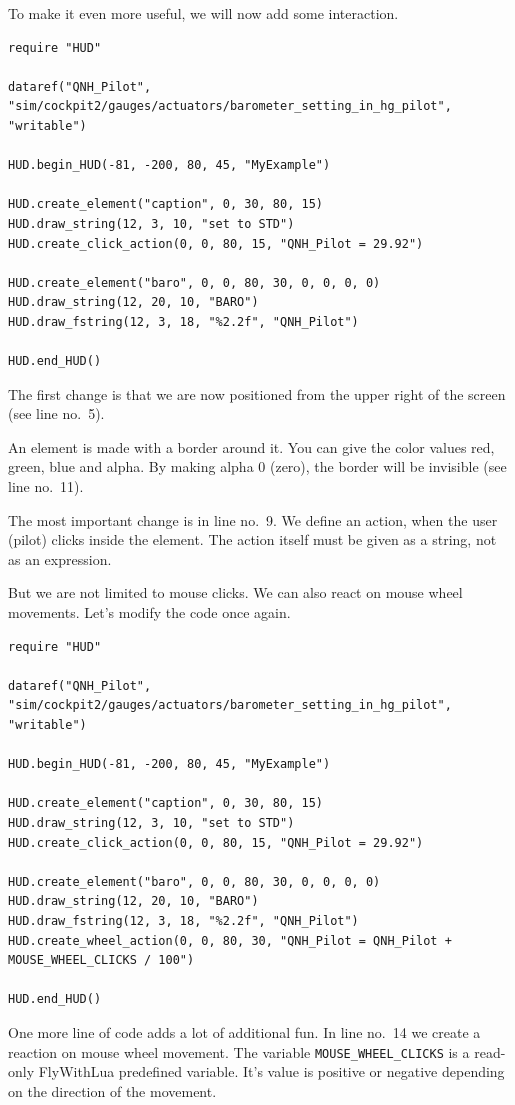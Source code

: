 \documentclass[11pt,parskip=half,a4paper]{scrartcl}
\begin{document}
To make it even more useful, we will now add some interaction.

\begin{lstlisting}[firstnumber=1]
require "HUD"

dataref("QNH_Pilot", "sim/cockpit2/gauges/actuators/barometer_setting_in_hg_pilot", "writable")

HUD.begin_HUD(-81, -200, 80, 45, "MyExample")

HUD.create_element("caption", 0, 30, 80, 15)
HUD.draw_string(12, 3, 10, "set to STD")
HUD.create_click_action(0, 0, 80, 15, "QNH_Pilot = 29.92")

HUD.create_element("baro", 0, 0, 80, 30, 0, 0, 0, 0)
HUD.draw_string(12, 20, 10, "BARO")
HUD.draw_fstring(12, 3, 18, "%2.2f", "QNH_Pilot")

HUD.end_HUD()
\end{lstlisting}

The first change is that we are now positioned from the upper right of the screen (see line no.~5).

An element is made with a border around it. You can give the color values red, green, blue and alpha. By making alpha 0 (zero), the border will be invisible (see line no.~11).

The most important change is in line no.~9. We define an action, when the user (pilot) clicks inside the element. The action itself must be given as a string, not as an expression.

But we are not limited to mouse clicks. We can also react on mouse wheel movements. Let's modify the code once again.

\begin{lstlisting}[firstnumber=1]
require "HUD"

dataref("QNH_Pilot", "sim/cockpit2/gauges/actuators/barometer_setting_in_hg_pilot", "writable")

HUD.begin_HUD(-81, -200, 80, 45, "MyExample")

HUD.create_element("caption", 0, 30, 80, 15)
HUD.draw_string(12, 3, 10, "set to STD")
HUD.create_click_action(0, 0, 80, 15, "QNH_Pilot = 29.92")

HUD.create_element("baro", 0, 0, 80, 30, 0, 0, 0, 0)
HUD.draw_string(12, 20, 10, "BARO")
HUD.draw_fstring(12, 3, 18, "%2.2f", "QNH_Pilot")
HUD.create_wheel_action(0, 0, 80, 30, "QNH_Pilot = QNH_Pilot + MOUSE_WHEEL_CLICKS / 100")

HUD.end_HUD()
\end{lstlisting}

One more line of code adds a lot of additional fun. In line no.~14 we create a reaction on mouse wheel movement. The variable \verb|MOUSE_WHEEL_CLICKS| is a read-only FlyWithLua predefined variable. It's value is positive or negative depending on the direction of the movement.
\end{document}
